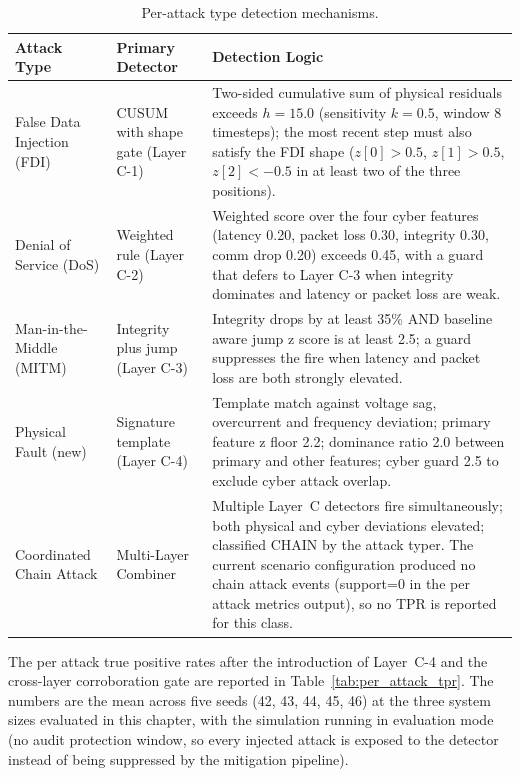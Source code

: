 \begin{table}[H]
\centering
\caption{Per-attack type detection mechanisms.}
\label{tab:per_attack}
\begin{tabular}{|l|l|p{5.5cm}|}
\hline
\textbf{Attack Type} & \textbf{Primary Detector} & \textbf{Detection Logic} \\ \hline
False Data Injection (FDI) & CUSUM with shape gate (Layer C-1) & Two-sided cumulative sum of physical residuals exceeds $h=15.0$ (sensitivity $k=0.5$, window 8 timesteps); the most recent step must also satisfy the FDI shape ($z[0]>0.5$, $z[1]>0.5$, $z[2]<-0.5$ in at least two of the three positions). \\ \hline
Denial of Service (DoS) & Weighted rule (Layer C-2) & Weighted score over the four cyber features (latency 0.20, packet loss 0.30, integrity 0.30, comm drop 0.20) exceeds 0.45, with a guard that defers to Layer C-3 when integrity dominates and latency or packet loss are weak. \\ \hline
Man-in-the-Middle (MITM) & Integrity plus jump (Layer C-3) & Integrity drops by at least 35\% AND baseline aware jump z score is at least 2.5; a guard suppresses the fire when latency and packet loss are both strongly elevated. \\ \hline
Physical Fault (new) & Signature template (Layer C-4) & Template match against voltage sag, overcurrent and frequency deviation; primary feature z floor 2.2; dominance ratio 2.0 between primary and other features; cyber guard 2.5 to exclude cyber attack overlap. \\ \hline
Coordinated Chain Attack & Multi-Layer Combiner & Multiple Layer~C detectors fire simultaneously; both physical and cyber deviations elevated; classified CHAIN by the attack typer. The current scenario configuration produced no chain attack events (support=0 in the per attack metrics output), so no TPR is reported for this class. \\ \hline
\end{tabular}
\end{table}

\noindent
The per attack true positive rates after the introduction of Layer~C-4 and the cross-layer corroboration gate are reported in Table~\ref{tab:per_attack_tpr}. The numbers are the mean across five seeds (42, 43, 44, 45, 46) at the three system sizes evaluated in this chapter, with the simulation running in evaluation mode (no audit protection window, so every injected attack is exposed to the detector instead of being suppressed by the mitigation pipeline).

